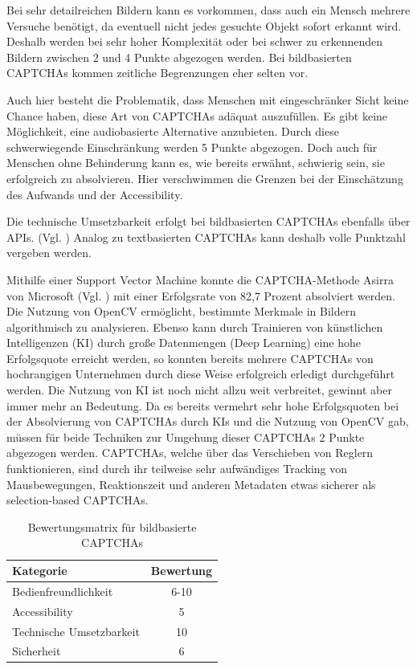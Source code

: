 Bei sehr detailreichen Bildern kann es vorkommen, dass auch ein Mensch mehrere Versuche benötigt, da eventuell nicht jedes gesuchte Objekt sofort erkannt wird.
Deshalb werden bei sehr hoher Komplexität oder bei schwer zu erkennenden Bildern zwischen 2 und 4 Punkte abgezogen werden.
Bei bildbasierten CAPTCHAs kommen zeitliche Begrenzungen eher selten vor. 

Auch hier besteht die Problematik, dass Menschen mit eingeschränker Sicht keine Chance haben, diese Art von CAPTCHAs adäquat auszufüllen.
Es gibt keine Möglichkeit, eine audiobasierte Alternative anzubieten. Durch diese schwerwiegende Einschränkung werden 5 Punkte abgezogen.
Doch auch für Menschen ohne Behinderung kann es, wie bereits erwähnt, schwierig sein, sie erfolgreich zu absolvieren.
Hier verschwimmen die Grenzen bei der Einschätzung des Aufwands und der Accessibility.

Die technische Umsetzbarkeit erfolgt bei bildbasierten CAPTCHAs ebenfalls über APIs. (Vgl. \cite{hcaptcha} \cite{arkoselabs} \cite{geetest})
Analog zu textbasierten CAPTCHAs kann deshalb volle Punktzahl vergeben werden.

Mithilfe einer Support Vector Machine konnte die CAPTCHA-Methode Asirra von Microsoft (Vgl. \cite{elson2007asirra})
mit einer Erfolgsrate von 82,7 Prozent absolviert werden. 
Die Nutzung von OpenCV ermöglicht, bestimmte Merkmale in Bildern algorithmisch zu analysieren.
Ebenso kann durch Trainieren von künstlichen Intelligenzen (KI) durch große Datenmengen (Deep Learning) eine hohe Erfolgsquote erreicht werden,
so konnten bereits mehrere CAPTCHAs von hochrangigen Unternehmen durch diese Weise erfolgreich erledigt durchgeführt werden.
Die Nutzung von KI ist noch nicht allzu weit verbreitet, gewinnt aber immer mehr an Bedeutung.
Da es bereits vermehrt sehr hohe Erfolgsquoten bei der Absolvierung von CAPTCHAs durch KIs und die Nutzung von OpenCV gab,
müssen für beide Techniken zur Umgehung dieser CAPTCHAs 2 Punkte abgezogen werden.
CAPTCHAs, welche über das Verschieben von Reglern funktionieren, sind durch ihr teilweise sehr aufwändiges Tracking von Mausbewegungen,
Reaktionszeit und anderen Metadaten etwas sicherer als selection-based CAPTCHAs. \cite[p.77f]{surveyofresearch}


\begin{table}[h!]
    \caption{Bewertungsmatrix für bildbasierte CAPTCHAs}
    \begin{center}
        \begin{tabular}{l|c}
            Kategorie                       & Bewertung \\\hline
            Bedienfreundlichkeit            & 6-10         \\
            Accessibility                   & 5        \\
            Technische Umsetzbarkeit        & 10         \\
            Sicherheit                      & 6         
        \end{tabular}
    \end{center}
\end{table}


